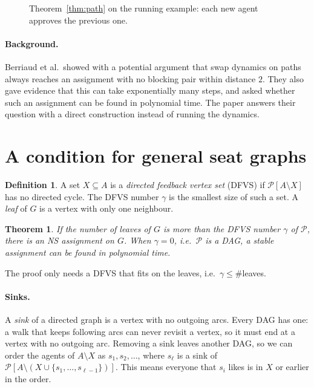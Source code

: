 \documentclass[11pt,a4paper]{article}
\newtheorem{theorem}{Theorem}
\theoremstyle{definition}
\newtheorem{definition}{Definition}
\theoremstyle{remark}
\theoremstyle{plain}
\newcommand{\cP}{\mathcal{P}}
\newcommand{\pathseat}[4]{%
  \draw[sedge] (0,0) -- (4.5,0);
  \node[ag#1] (#1) at (0,0) {#1}; \node[ag#2] (#2) at (1.5,0) {#2};
  \node[ag#3] (#3) at (3,0) {#3}; \node[ag#4] (#4) at (4.5,0) {#4};}
\newcommand{\seatlabels}{\foreach \i in {1,...,4}{\node[lab] at ({(\i-1)*1.5},-0.6) {$v_{\i}$};}}
\begin{document}
\begin{figure}[h]
\centering
{}
\caption{Theorem~\ref{thm:path} on the running example: each new agent approves the previous one.}
\label{fig:path}
\end{figure}

\paragraph{Background.} Berriaud et al.\ showed with a potential argument that swap dynamics on paths always reaches an assignment with no blocking pair within distance $2$. They also gave evidence that this can take exponentially many steps, and asked whether such an assignment can be found in polynomial time. The paper answers their question with a direct construction instead of running the dynamics.

\section{A condition for general seat graphs}

\begin{definition}
A set $X\subseteq A$ is a \emph{directed feedback vertex set} (DFVS) if $\cP[A\setminus X]$ has no directed cycle. The DFVS number $\gamma$ is the smallest size of such a set. A \emph{leaf} of $G$ is a vertex with only one neighbour.
\end{definition}

\begin{theorem}\label{thm:dfvs}
If the number of leaves of $G$ is more than the DFVS number $\gamma$ of $\cP$, there is an NS assignment on $G$. When $\gamma=0$, i.e.\ $\cP$ is a DAG, a stable assignment can be found in polynomial time.
\end{theorem}

The proof only needs a DFVS that fits on the leaves, i.e.\ $\gamma\le\#$leaves.

\paragraph{Sinks.} A \emph{sink} of a directed graph is a vertex with no outgoing arcs. Every DAG has one: a walk that keeps following arcs can never revisit a vertex, so it must end at a vertex with no outgoing arc. Removing a sink leaves another DAG, so we can order the agents of $A\setminus X$ as $s_1,s_2,\dots$, where $s_\ell$ is a sink of $\cP[A\setminus(X\cup\{s_1,\dots,s_{\ell-1}\})]$. This means everyone that $s_i$ likes is in $X$ or earlier in the order.
\end{document}
